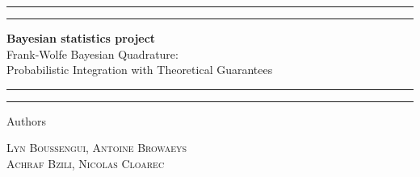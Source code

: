\begin{minipage}[h]{\textwidth}
  \begin{titlepage} %

    \centering %

    \scshape %

    \vspace*{\baselineskip} %


    \rule{\textwidth}{1.6pt}\vspace*{-\baselineskip}\vspace*{2pt} %
    \rule{\textwidth}{0.4pt} %

    \vspace{0.75\baselineskip} %

    {\large \textbf{Bayesian statistics project}\\
    \LARGE Frank-Wolfe Bayesian Quadrature:\\
     Probabilistic Integration with Theoretical Guarantees\\
     } %

    \vspace{0.75\baselineskip} %

    \rule{\textwidth}{0.4pt}\vspace*{-\baselineskip}\vspace{3.2pt} %
    \rule{\textwidth}{1.6pt} %

    \vspace{2\baselineskip} %


    Authors

    \vspace{0.5\baselineskip} %

    {\scshape\large Lyn​ Boussengui, Antoine Browaeys\\ Achraf Bzili, Nicolas Cloarec} %

    \vspace{0.5\baselineskip} %
  \end{titlepage}

\end{minipage}

